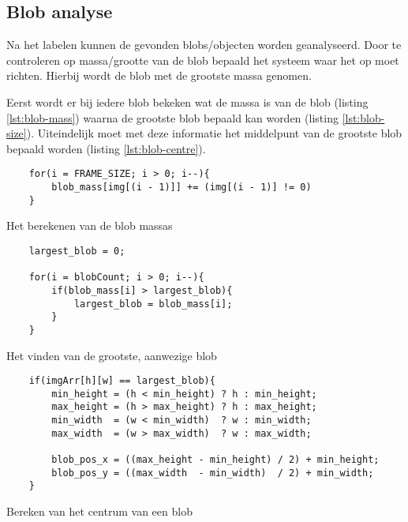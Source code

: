 \subsection{Blob analyse}

Na het labelen kunnen de gevonden blobs/objecten worden geanalyseerd. Door
te controleren op massa/grootte van de blob bepaald het systeem waar het op
moet richten. Hierbij wordt de blob met de grootste massa genomen.

Eerst wordt er bij iedere blob bekeken wat de massa is van de blob (listing
\ref{lst:blob-mass}) waarna de grootste blob bepaald kan worden (listing
\ref{lst:blob-size}). Uiteindelijk moet met deze informatie het middelpunt van
de grootste blob bepaald worden (listing \ref{lst:blob-centre}).

\begin{listing}
    \begin{verbatim}
    for(i = FRAME_SIZE; i > 0; i--){
        blob_mass[img[(i - 1)]] += (img[(i - 1)] != 0)
    }
    \end{verbatim}
    \caption{Het berekenen van de blob massas}
    \label{lst:blob-mass}
\end{listing}

\begin{listing}
    \begin{verbatim}
    largest_blob = 0;

    for(i = blobCount; i > 0; i--){
        if(blob_mass[i] > largest_blob){
            largest_blob = blob_mass[i];
        }
    }
    \end{verbatim}
    \caption{Het vinden van de grootste, aanwezige blob}
    \label{lst:blob-size}
\end{listing}

\begin{listing}
    \begin{verbatim}
    if(imgArr[h][w] == largest_blob){
        min_height = (h < min_height) ? h : min_height;
        max_height = (h > max_height) ? h : max_height;
        min_width  = (w < min_width)  ? w : min_width;
        max_width  = (w > max_width)  ? w : max_width;

        blob_pos_x = ((max_height - min_height) / 2) + min_height;
        blob_pos_y = ((max_width  - min_width)  / 2) + min_width;
    }
    \end{verbatim}
    \caption{Bereken van het centrum van een blob}
    \label{lst:blob-centre}
\end{listing}

